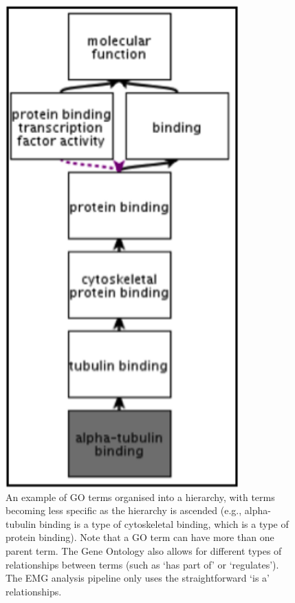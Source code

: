 \begin{figure}[Figure 2]
\centering
\includegraphics[width=0.8\textwidth]{handout/GO.png}
\caption{An example of GO terms organised into a hierarchy, with terms becoming less specific as the hierarchy is ascended (e.g., alpha-tubulin binding is a type of cytoskeletal binding, which is a type of protein binding). Note that a GO term can have more than one parent term. The Gene Ontology also allows for different types of relationships between terms (such as ‘has part of’ or ‘regulates’). The EMG analysis pipeline only uses the straightforward ‘is a’ relationships.}
\label{fig:GO}
\end{figure}

